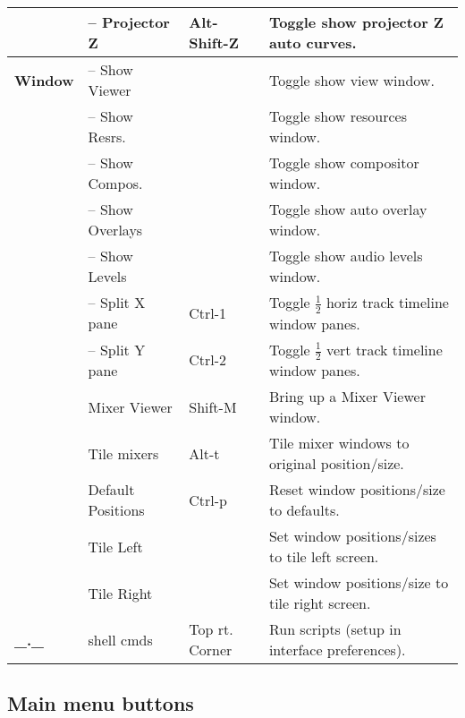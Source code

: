 \begin{longtable}[h]{>{\bfseries}p{}p{}p{}p{}}
  & -- Projector Z & Alt-Shift-Z & Toggle show projector Z auto curves. \\
  \midrule
  \textcolor{CinBlueText}{Window} & -- Show Viewer &  & Toggle show view window. \\
  & -- Show Resrs. &  & Toggle show resources window. \\
  & -- Show Compos. &  & Toggle show compositor window. \\
  & -- Show Overlays &  & Toggle show auto overlay window. \\
  & -- Show Levels &  & Toggle show audio levels window. \\
  & -- Split X pane & Ctrl-1 & Toggle $\frac{1}{2}$ horiz track timeline window panes. \\
  & -- Split Y pane & Ctrl-2 & Toggle $\frac{1}{2}$ vert track timeline window panes. \\
  & Mixer Viewer & Shift-M & Bring up a Mixer Viewer window. \\
  & Tile mixers & Alt-t & Tile mixer windows to original position/size. \\
  & Default Positions & Ctrl-p & Reset window positions/size to defaults. \\
  & Tile Left &  & Set window positions/sizes to tile left screen. \\
  & Tile Right &  & Set window positions/size to tile right screen. \\
  \midrule
  \textcolor{CinBlueText}{\_.\_} & shell cmds & Top rt. Corner & Run scripts (setup in interface preferences). \\
  \bottomrule
\end{longtable}


\subsection*{Main menu buttons}%
\label{sub:main_menu_buttons}

